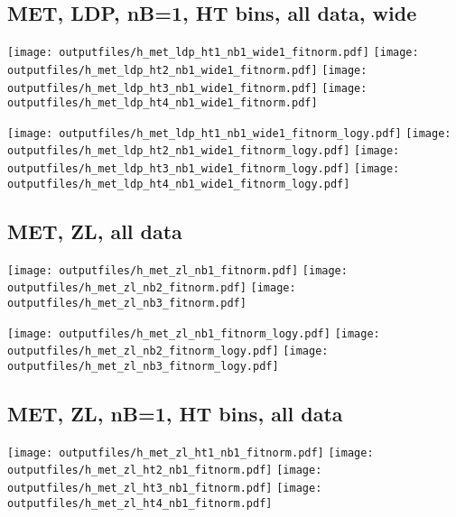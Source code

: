 \documentclass[11pt]{article}
\begin{document}
    \clearpage
     \subsection{ MET, LDP, nB=1, HT bins, all data, wide}

    \noindent
     \texttt{[image: outputfiles/h\_met\_ldp\_ht1\_nb1\_wide1\_fitnorm.pdf]}
     \texttt{[image: outputfiles/h\_met\_ldp\_ht2\_nb1\_wide1\_fitnorm.pdf]}
     \texttt{[image: outputfiles/h\_met\_ldp\_ht3\_nb1\_wide1\_fitnorm.pdf]}
     \texttt{[image: outputfiles/h\_met\_ldp\_ht4\_nb1\_wide1\_fitnorm.pdf]}

    \noindent
     \texttt{[image: outputfiles/h\_met\_ldp\_ht1\_nb1\_wide1\_fitnorm\_logy.pdf]}
     \texttt{[image: outputfiles/h\_met\_ldp\_ht2\_nb1\_wide1\_fitnorm\_logy.pdf]}
     \texttt{[image: outputfiles/h\_met\_ldp\_ht3\_nb1\_wide1\_fitnorm\_logy.pdf]}
     \texttt{[image: outputfiles/h\_met\_ldp\_ht4\_nb1\_wide1\_fitnorm\_logy.pdf]}




     \subsection{ MET, ZL, all data}

    \noindent
     \texttt{[image: outputfiles/h\_met\_zl\_nb1\_fitnorm.pdf]}
     \texttt{[image: outputfiles/h\_met\_zl\_nb2\_fitnorm.pdf]}
     \texttt{[image: outputfiles/h\_met\_zl\_nb3\_fitnorm.pdf]}

    \noindent
     \texttt{[image: outputfiles/h\_met\_zl\_nb1\_fitnorm\_logy.pdf]}
     \texttt{[image: outputfiles/h\_met\_zl\_nb2\_fitnorm\_logy.pdf]}
     \texttt{[image: outputfiles/h\_met\_zl\_nb3\_fitnorm\_logy.pdf]}








     \subsection{ MET, ZL, nB=1, HT bins, all data}

    \noindent
     \texttt{[image: outputfiles/h\_met\_zl\_ht1\_nb1\_fitnorm.pdf]}
     \texttt{[image: outputfiles/h\_met\_zl\_ht2\_nb1\_fitnorm.pdf]}
     \texttt{[image: outputfiles/h\_met\_zl\_ht3\_nb1\_fitnorm.pdf]}
     \texttt{[image: outputfiles/h\_met\_zl\_ht4\_nb1\_fitnorm.pdf]}
\end{document}
